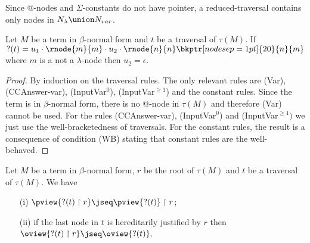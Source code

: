 Since @-nodes and $\Sigma$-constants do not have pointer, a
reduced-traversal contains only nodes in $N_\lambda \union N_{var}$.


\begin{lem}
\label{lem:var_followedby_child} Let $M$ be a term in $\beta$-normal
form and $t$ be a traversal of $\tau(M)$. If $?(t) = u_1 \cdot
\rnode{m}{m} \cdot u_2 \cdot \rnode{n}{n}
\bkptr[nodesep=1pt]{20}{n}{m}$ where $m$ is a not a $\lambda$-node
then $u_2 = \epsilon$.
\end{lem}
\begin{proof}
By induction on the traversal rules. The only relevant rules are (Var), (CCAnswer-var), (InputVar$^0$), (InputVar$^{\geq 1}$)
and the constant rules.
Since the term is in $\beta$-normal form, there is no @-node in $\tau(M)$ and therefore (Var) cannot be used.
For the rules (CCAnswer-var), (InputVar$^0$) and (InputVar$^{\geq 1})$ we just use the well-bracketedness of traversals.
For the constant rules, the result is a consequence of condition (WB) stating that constant rules are the well-behaved.
\end{proof}

\begin{lem}
\label{lem:redtrav_trav} Let $M$ be a term in $\beta$-normal form,
$r$ be the root of $\tau(M)$ and $t$ be a traversal of $\tau(M)$. We have
\begin{itemize}
\item[(i)] $ \pview{?(t) \upharpoonright  r } \jseq \pview{?(t)} \upharpoonright r$;
\item[(ii)] if the last node in $t$ is hereditarily justified by $r$ then $ \oview{?(t) \upharpoonright r } \jseq \oview{?(t)}$.
\end{itemize}
\end{lem}

